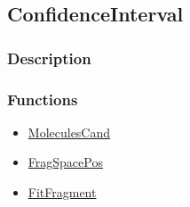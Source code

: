 \subsection{ConfidenceInterval}\label{ConfidenceInteval}
\subsubsection{Description}


\subsubsection{Functions}
\begin{itemize}
\item \hyperref[MoleculesCand]{MoleculesCand}
\item \hyperref[FragSpacePos]{FragSpacePos}
\item \hyperref[FitFragment]{FitFragment}
\end{itemize}

